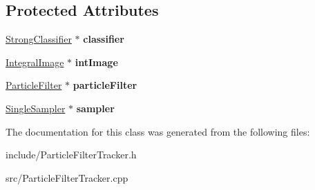 \subsection*{Protected Attributes}
\begin{DoxyCompactItemize}
\item 
\hypertarget{classParticleFilterTracker_ad585da715e3f1711ea1c554ffd94e389}{}\hyperlink{classStrongClassifier}{Strong\+Classifier} $\ast$ {\bfseries classifier}\label{classParticleFilterTracker_ad585da715e3f1711ea1c554ffd94e389}

\item 
\hypertarget{classParticleFilterTracker_abd3719107a5a7594cd90eded262ff246}{}\hyperlink{classIntegralImage}{Integral\+Image} $\ast$ {\bfseries int\+Image}\label{classParticleFilterTracker_abd3719107a5a7594cd90eded262ff246}

\item 
\hypertarget{classParticleFilterTracker_aad6d152590d59bbd7cbd0515a14b3954}{}\hyperlink{classParticleFilter}{Particle\+Filter} $\ast$ {\bfseries particle\+Filter}\label{classParticleFilterTracker_aad6d152590d59bbd7cbd0515a14b3954}

\item 
\hypertarget{classParticleFilterTracker_a303637e59f314e0fa72802e3e39ee812}{}\hyperlink{classSingleSampler}{Single\+Sampler} $\ast$ {\bfseries sampler}\label{classParticleFilterTracker_a303637e59f314e0fa72802e3e39ee812}

\end{DoxyCompactItemize}


The documentation for this class was generated from the following files\+:\begin{DoxyCompactItemize}
\item 
include/Particle\+Filter\+Tracker.\+h\item 
src/Particle\+Filter\+Tracker.\+cpp\end{DoxyCompactItemize}
